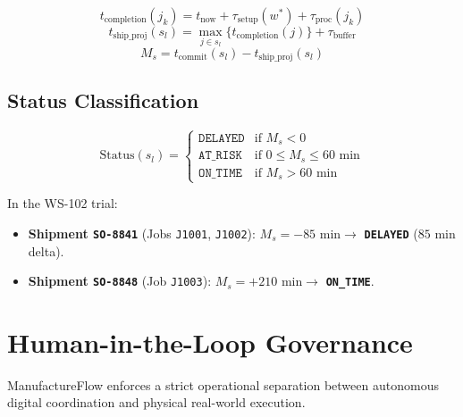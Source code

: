 \documentclass[10pt,twocolumn,a4paper]{article}
\begin{document}
\begin{equation}
    t_{\text{completion}}(j_k) = t_{\text{now}} + \tau_{\text{setup}}(w^*) + \tau_{\text{proc}}(j_k)
\end{equation}
\begin{equation}
    t_{\text{ship\_proj}}(s_l) = \max_{j \in s_l} \{ t_{\text{completion}}(j) \} + \tau_{\text{buffer}}
\end{equation}
\begin{equation}
    M_s = t_{\text{commit}}(s_l) - t_{\text{ship\_proj}}(s_l)
\end{equation}

\subsection{Status Classification}
\begin{equation}
    \text{Status}(s_l) = \begin{cases}
        \texttt{DELAYED} & \text{if } M_s < 0 \\
        \texttt{AT\_RISK} & \text{if } 0 \le M_s \le 60\text{ min} \\
        \texttt{ON\_TIME} & \text{if } M_s > 60\text{ min}
    \end{cases}
\end{equation}

In the WS-102 trial:
\begin{itemize}
    \item \textbf{Shipment \texttt{SO-8841}} (Jobs \texttt{J1001}, \texttt{J1002}): $M_s = -85\text{ min} \to$ \textbf{\texttt{DELAYED}} ($85\text{ min}$ delta).
    \item \textbf{Shipment \texttt{SO-8848}} (Job \texttt{J1003}): $M_s = +210\text{ min} \to$ \textbf{\texttt{ON\_TIME}}.
\end{itemize}

\section{Human-in-the-Loop Governance}
\label{sec:governance}
ManufactureFlow enforces a strict operational separation between autonomous digital coordination and physical real-world execution.
\end{document}
